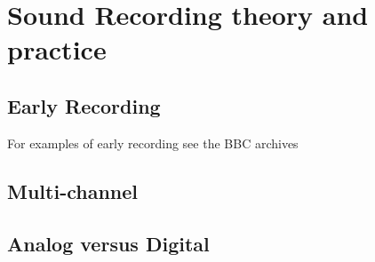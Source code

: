 
\chapter{Sound Recording theory and practice}
\label{history}

\section{Early Recording}
For examples of early recording see the BBC archives
\section{Multi-channel}
\section{Analog versus Digital}




